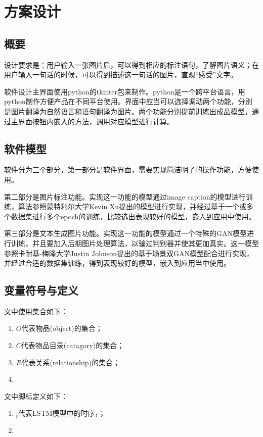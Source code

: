 
\chapter{方案设计}

\section{概要}
设计要求是：用户输入一张图片后，可以得到相应的标注语句，了解图片语义；在用户输入一句话的时候，可以得到描述这一句话的图片，直观“感受”文字。

软件设计主界面使用python的tkinter包来制作。python是一个跨平台语言，用python制作方便产品在不同平台使用。界面中应当可以选择调动两个功能，分别是图片翻译为自然语言和语句翻译为图片。两个功能分别提前训练出成品模型，通过主界面按钮内嵌入的方法，调用对应模型进行计算。

\section{软件模型}
软件分为三个部分，第一部分是软件界面，需要实现简洁明了的操作功能，方便使用。

第二部分是图片标注功能。实现这一功能的模型通过image caption的模型进行训练，算法参照蒙特利尔大学Kevin Xu提出的模型进行实现，并经过基于一个或多个数据集进行多个epoch的训练，比较选出表现较好的模型，嵌入到应用中使用。

第三部分是文本生成图片功能。实现这一功能的模型通过一个特殊的GAN模型进行训练，并且要加入后期图片处理算法，以骗过判别器并使其更加真实。这一模型参照卡耐基-梅隆大学Justin Johnson提出的基于场景双GAN模型配合进行实现，并经过合适的数据集训练，得到表现较好的模型，嵌入到应用当中使用。

\section{变量符号与定义}
文中使用集合如下：
\begin{enumerate}[fullwidth,itemindent=2em,label=\arabic*.]
    \item $O$代表物品(object)的集合；
    \item $C$代表物品目录(catagory)的集合；
    \item $R$代表关系(relationship)的集合；
    \item 
\end{enumerate}

文中脚标定义如下：
\begin{enumerate}[fullwidth,itemindent=2em,label=\arabic*.]
    \item ${}_t$代表LSTM模型中的时序，；
    \item 
\end{enumerate}

